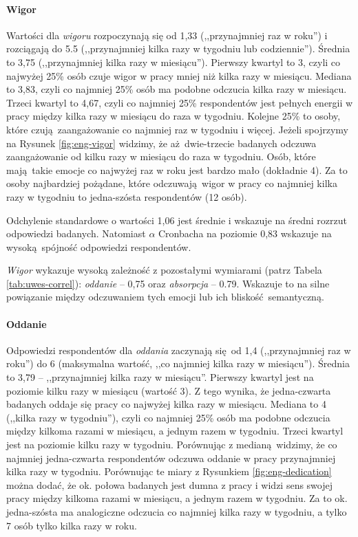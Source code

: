 \paragraph{Wigor} Wartości dla \textit{wigoru} rozpoczynają się od 1,33 (,,przynajmniej raz w roku'') i rozciągają do 5.5 (,,przynajmniej kilka razy w tygodniu lub codziennie''). Średnia to 3,75 (,,przynajmniej kilka razy w miesiącu''). Pierwszy kwartyl to 3, czyli co najwyżej 25\% osób czuje wigor w pracy mniej niż kilka razy w miesiącu. Mediana to 3,83, czyli co najmniej 25\% osób ma podobne odczucia kilka razy w miesiącu. Trzeci kwartyl to 4,67, czyli co najmniej 25\%
respondentów jest pełnych energii w pracy między kilka razy w miesiącu do raza w tygodniu. Kolejne 25\% to osoby, które czują zaangażowanie co najmniej raz w tygodniu i więcej. Jeżeli spojrzymy na Rysunek \ref{fig:eng-vigor} widzimy, że aż dwie-trzecie badanych odczuwa zaangażowanie od kilku razy w miesiącu do raza w tygodniu. Osób, które mają takie emocje co najwyżej raz w roku jest bardzo mało (dokładnie 4). Za to osoby najbardziej pożądane, które odczuwają wigor w pracy co najmniej
kilka razy w tygodniu to jedna-szósta respondentów (12 osób).

Odchylenie standardowe o wartości 1,06 jest średnie i wskazuje na średni rozrzut odpowiedzi badanych. Natomiast $\alpha$ Cronbacha na poziomie 0,83 wskazuje na wysoką spójność odpowiedzi respondentów.

\textit{Wigor} wykazuje wysoką zależność z pozostałymi wymiarami (patrz Tabela \ref{tab:uwes-correl}): \textit{oddanie} -- 0,75 oraz \textit{absorpcja} -- 0.79. Wskazuje to na silne powiązanie między odczuwaniem tych emocji lub ich bliskość semantyczną.

\paragraph{Oddanie} Odpowiedzi respondentów dla \textit{oddania} zaczynają się od 1,4 (,,przynajmniej raz w roku'') do 6 (maksymalna wartość, ,,co najmniej kilka razy w miesiącu''). Średnia to 3,79 -- ,,przynajmniej kilka razy w miesiącu''. Pierwszy kwartyl jest na poziomie kilku razy w miesiącu (wartość 3). Z tego wynika, że jedna-czwarta badanych oddaje się pracy co najwyżej kilka razy w miesiącu. Mediana to 4 (,,kilka razy w tygodniu''), czyli co najmniej 25\% osób ma podobne odczucia
między kilkoma razami w miesiącu, a jednym razem w tygodniu. Trzeci kwartyl jest na poziomie kilku razy w tygodniu. Porównując z medianą widzimy, że co najmniej jedna-czwarta respondentów odczuwa oddanie w pracy przynajmniej kilka razy w tygodniu. Porównując te miary z Rysunkiem \ref{fig:eng-dedication} można dodać, że ok. połowa badanych jest dumna z pracy i widzi sens swojej pracy między kilkoma razami w miesiącu, a jednym razem w tygodniu. Za to ok.
jedna-szósta ma analogiczne odczucia co najmniej kilka razy w tygodniu, a tylko 7 osób tylko kilka razy w roku.

